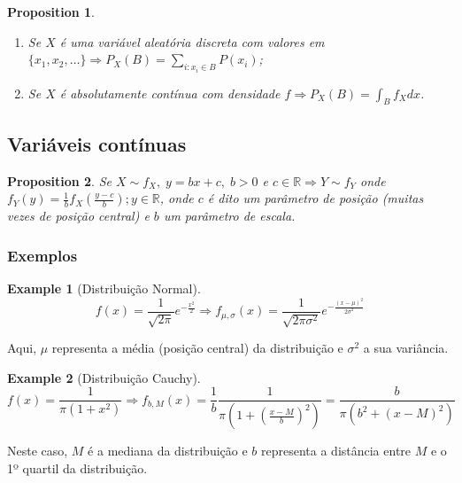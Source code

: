 \documentclass[
]{article}
\providecommand{\tightlist}{%
  \setlength{\itemsep}{0pt}\setlength{\parskip}{0pt}}
\newtheorem{proposition}{Proposition}[section]
\theoremstyle{definition}
\theoremstyle{definition}
\newtheorem{example}{Example}[section]
\theoremstyle{definition}
\theoremstyle{definition}
\theoremstyle{remark}
\begin{document}
\begin{proposition}
\leavevmode

\begin{enumerate}
\def\labelenumi{\alph{enumi})}
\tightlist
\item
  Se \(X\) é uma variável aleatória discreta com valores em \(\{x_{1},x_{2},\ldots\} \Rightarrow P_{X}(B) = \sum_{i:x_{i} \in B}P(x_{i})\);
\item
  Se \(X\) é absolutamente contínua com densidade \(f \Rightarrow P_{X}(B) = \int_{B}f_{X}dx\).
\end{enumerate}

\end{proposition}

\hypertarget{variuxe1veis-contuxednuas}{%
\subsection{Variáveis contínuas}\label{variuxe1veis-contuxednuas}}

\begin{proposition}
Se \(X \sim f_{X}, \; y = bx+c, \; b>0\) e \(c \in \mathbb{R} \Rightarrow Y \sim f_{Y}\) onde \(f_{Y}(y) = \frac{1}{b}f_{X}(\frac{y-c}{b}); y \in \mathbb{R}\), onde \(c\) é dito um parâmetro de posição (muitas vezes de posição central) e \(b\) um parâmetro de escala.
\end{proposition}

\hypertarget{exemplos}{%
\subsubsection{Exemplos}\label{exemplos}}

\begin{example}[Distribuição Normal]
\begin{equation*}
f(x) = \frac{1}{\sqrt{2\pi}}e^{-\frac{x^{2}}{2}} \Longrightarrow f_{\mu,\sigma}(x) = \frac{1}{\sqrt{2\pi\sigma^{2}}}e^{-\frac{(x-\mu)^{2}}{2 \sigma^{2}}}
\end{equation*}

Aqui, \(\mu\) representa a média (posição central) da distribuição e \(\sigma^{2}\) a sua variância.
\end{example}

\begin{example}[Distribuição Cauchy]
\begin{equation*}
f(x) = \frac{1}{\pi(1 + x^{2})} \Longrightarrow f_{b,M}(x) = \frac{1}{b}\frac{1}{\pi\left(1+\left(\frac{x-M}{b}\right)^{2}\right)} = \frac{b}{\pi(b^{2}+(x-M)^2)}
\end{equation*}

Neste caso, \(M\) é a mediana da distribuição e \(b\) representa a distância entre \(M\) e o 1º quartil da distribuição.
\end{example}
\end{document}

